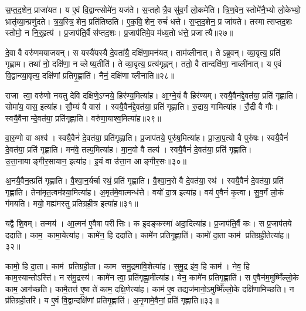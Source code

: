 स॒प्त॒द॒शेन॒ प्राजा॑यत।
य ए॒वं वि॒द्वान्त्सोमे॑न॒ यज॑ते।
स॒प्तहोत्रै॒व सु॑व॒र्गं लो॒कमे॑ति।
त्रि॒ण॒वेन॒ स्तोमे॑नै॒भ्यो लो॒केभ्यो॒ भ्रातृ॑व्या॒न्प्रणु॑दते।
त्र॒य॒स्त्रि॒शेन॒ प्रति॑तिष्ठति।
ए॒क॒वि॒शेन॒ रुचं॑ धत्ते।
स॒प्त॒द॒शेन॒ प्र जा॑यते।
तस्मात्सप्तद॒शः स्तोमो॒ न नि॒र्॒हृत्य॑।
प्र॒जाप॑ति॒र्वै स॑प्तद॒शः।
प्र॒जाप॑तिमे॒व म॑ध्य॒तो ध॑त्ते॒ प्रजात्यै॥२७॥\anuvakamend[अ॒न॒न्द॒द्भुव॒ इति॒ व्याह॑र॒द्वेदा॑सी॒द्वेदा॑धत्त॒ प्रजात्यै]

दे॒वा वै वरु॑णमयाजयन्।
स यस्यै॑यस्यै दे॒वता॑यै॒ दक्षि॑णा॒मन॑यत्।
ताम॑व्लीनात्।
तेऽब्रुवन्।
व्या॒वृत्य॒ प्रति॑ गृह्णाम।
तथा॑ नो॒ दक्षि॑णा॒ न व्लेष्य॒तीति॑।
ते व्या॒वृत्य॒ प्रत्य॑गृह्णन्।
ततो॒ वै तान्दक्षि॑णा॒ नाव्ली॑नात्।
य ए॒वं वि॒द्वान्व्या॒वृत्य॒ दक्षि॑णां प्रतिगृ॒ह्णाति॑।
नैनं॒ दक्षि॑णा व्लीनाति॥२८॥

राजा त्वा॒ वरु॑णो नयतु देवि दक्षिणे॒ऽग्नये॒ हिर॑ण्य॒मित्या॑ह।
आ॒ग्ने॒यं वै हिर॑ण्यम्।
स्वयै॒वैन॑द्दे॒वत॑या॒ प्रति॑ गृह्णाति।
सोमा॑य॒ वास॒ इत्या॑ह।
सौ॒म्यं वै वास॑।
स्वयै॒वैन॑द्दे॒वत॑या॒ प्रति॑ गृह्णाति।
रु॒द्राय॒ गामित्या॑ह।
रौ॒द्री वै गौः।
स्वयै॒वैनान्दे॒वत॑या॒ प्रति॑गृह्णाति।
वरु॑णा॒याश्व॒मित्या॑ह॥२९॥

वा॒रु॒णो वा अश्व॑।
स्वयै॒वैनं॑ दे॒वत॑या॒ प्रति॑गृह्णाति।
प्र॒जाप॑तये॒ पुरु॑ष॒मित्या॑ह।
प्रा॒जा॒प॒त्यो वै पुरु॑षः।
स्वयै॒वैनं॑ दे॒वत॑या॒ प्रति॑ गृह्णाति।
मन॑वे॒ तल्प॒मित्या॑ह।
मा॒न॒वो वै तल्प॑।
स्वयै॒वैनं॑ दे॒वत॑या॒ प्रति॑ गृह्णाति।
उ॒त्ता॒नायाङ्गीर॒सायान॒ इत्या॑ह।
इ॒यं वा उ॑त्ता॒न आङ्गीर॒सः॥३०॥

अ॒नयै॒वैन॒त्प्रति॑ गृह्णाति।
वै॒श्वा॒न॒र्यर्चा रथं॒ प्रति॑ गृह्णाति।
वै॒श्वा॒न॒रो वै दे॒वत॑या॒ रथ॑।
स्वयै॒वैनं॑ दे॒वत॑या॒ प्रति॑ गृह्णाति।
तेना॑मृत॒त्वम॑श्या॒मित्या॑ह।
अ॒मृत॑मे॒वात्मन्ध॑त्ते।
वयो॑ दा॒त्र इत्या॑ह।
वय॑ ए॒वैनं॑ कृ॒त्वा।
सु॒व॒र्गं लो॒कं ग॑मयति।
मयो॒ मह्य॑मस्तु प्रतिग्रही॒त्र इत्या॑ह॥३१॥

यद्वै शि॒वम्।
तन्मय॑।
आ॒त्मन॑ ए॒वैषा परीत्तिः।
क इ॒दङ्कस्मा॑ अदा॒दित्या॑ह।
प्र॒जाप॑ति॒र्वै कः।
स प्र॒जाप॑तये ददाति।
काम॒ कामा॒येत्या॑ह।
कामे॑न॒ हि ददा॑ति।
कामे॑न प्रतिगृ॒ह्णाति॑।
कामो॑ दा॒ता काम॑ प्रतिग्रही॒तेत्या॑ह॥३२॥

कामो॒ हि दा॒ता।
काम॑ प्रतिग्रही॒ता।
काम समु॒द्रमावि॒शेत्या॑ह।
स॒मु॒द्र इ॑व॒ हि काम॑।
नेव॒ हि काम॒स्यान्तोऽस्ति॑।
न स॑मु॒द्रस्य॑।
कामे॑न त्वा॒ प्रति॑गृह्णा॒मीत्या॑ह।
येन॒ कामे॑न प्रतिगृ॒ह्णाति॑।
स ए॒वैन॑म॒मुष्मिँ॑ल्लो॒के काम॒ आग॑च्छति।
कामै॒तत्त॑ ए॒षा ते॑ काम॒ दक्षि॒णेत्या॑ह।
काम॑ ए॒व तद्यज॑मानो॒ऽमुष्मिँ॑ल्लो॒के दक्षि॑णामिच्छति।
न प्र॑तिग्रही॒तरि॑।
य ए॒वं वि॒द्वान्दक्षि॑णां प्रतिगृ॒ह्णाति॑।
अ॒नृ॒णामे॒वैनां॒ प्रति॑ गृह्णाति॥३३॥\anuvakamend[व्ली॒ना॒त्यश्व॒मित्या॑हाङ्गीर॒सः प्र॑तिग्रही॒त्र इत्या॑ह प्रतिग्रही॒तेत्या॑ह॒ दक्षि॒णेत्या॑ह च॒त्वारि॑ च]

